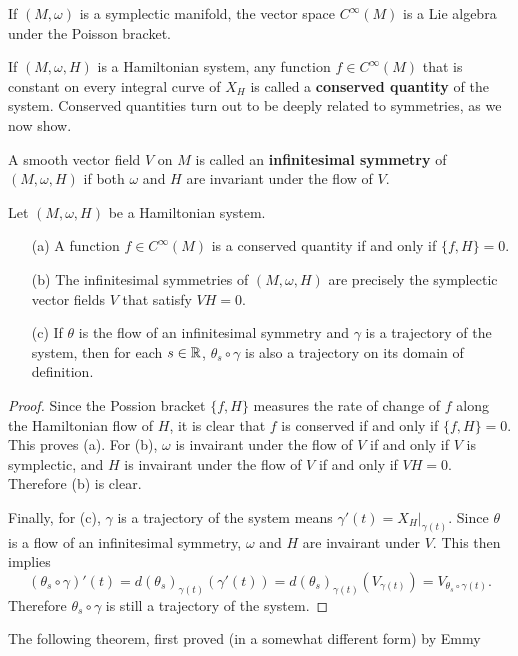 \begin{corollary}
If $(M,\omega)$ is a symplectic manifold, the vector space $C^\infty(M)$ is a Lie algebra under the Poisson bracket.
\end{corollary}

If $(M,\omega,H)$ is a Hamiltonian system, any function $f\in C^\infty(M)$ that is constant on every integral curve of $X_H$ is called a \textbf{conserved quantity} of the system. Conserved quantities turn out to be deeply related to symmetries, as we now show.\par
A smooth vector field $V$ on $M$ is called an \textbf{infinitesimal symmetry} of $(M,\omega,H)$ if both $\omega$ and $H$ are invariant under the flow of $V$.

\begin{proposition}\label{Hamiltonian system conserved quantity and infinitesimal symmetry prop}
Let $(M,\omega,H)$ be a Hamiltonian system.
\begin{enumerate}
\item[(a)] A function $f\in C^\infty(M)$ is a conserved quantity if and only if $\{f,H\}=0$.
\item[(b)] The infinitesimal symmetries of $(M,\omega,H)$ are precisely the symplectic vector fields $V$ that satisfy $VH=0$.
\item[(c)] If $\theta$ is the flow of an infinitesimal symmetry and $\gamma$ is a trajectory of the system, then for each $s\in\mathbb{R}$, $\theta_s\circ\gamma$ is also a trajectory on its domain of definition.
\end{enumerate}
\end{proposition}
\begin{proof}
Since the Possion bracket $\{f,H\}$ measures the rate of change of $f$ along the Hamiltonian flow of $H$, it is clear that $f$ is conserved if and only if $\{f,H\}=0$. This proves (a). For (b), $\omega$ is invairant under the flow of $V$ if and only if $V$ is symplectic, and $H$ is invairant under the flow of $V$ if and only if $VH=0$. Therefore (b) is clear.\par
Finally, for (c), $\gamma$ is a trajectory of the system means $\gamma'(t)=X_H|_{\gamma(t)}$. Since $\theta$ is a flow of an infinitesimal symmetry, $\omega$ and $H$ are invairant under $V$. This then implies 
\[(\theta_s\circ\gamma)'(t)=d(\theta_s)_{\gamma(t)}(\gamma'(t))=d(\theta_s)_{\gamma(t)}(V_{\gamma(t)})=V_{\theta_s\circ\gamma(t)}.\]
Therefore $\theta_s\circ\gamma$ is still a trajectory of the system.
\end{proof}
The following theorem, first proved (in a somewhat different form) by Emmy

